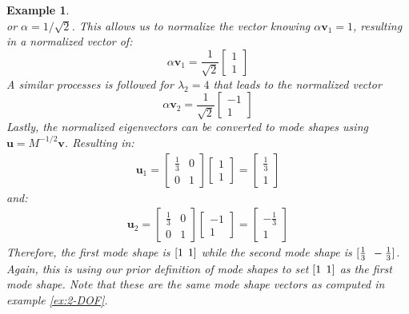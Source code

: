 \documentclass[12pt,letter]{article}
\newtheorem{ex}{Example}
\numberwithin{ex}{section} %
\newenvironment{example}{\begin{mdframed}[middlelinewidth=0.5mm]\begin{ex}\normalfont}{\end{ex}\end{mdframed}}
\numberwithin{re}{section} %
\begin{document}
\begin{example}
\begin{equation}
\end{equation}
or $\alpha = 1/\sqrt{2}$. This allows us to normalize the vector knowing $\alpha \textbf{v}_1=1$, resulting in a normalized vector of:
\begin{equation}
\alpha \textbf{v}_1=  \frac{1}{\sqrt{2}} \begin{bmatrix} 1 \\ 1 \end{bmatrix} 
\end{equation} 
A similar processes is followed for $\lambda_2=4$ that leads to the normalized vector 
\begin{equation}
\alpha \textbf{v}_2=  \frac{1}{\sqrt{2}} \begin{bmatrix} -1 \\ 1 \end{bmatrix} 
\end{equation} 
Lastly, the normalized eigenvectors can be converted to mode shapes using $\textbf{u} = M^{-1/2}\textbf{v}$. Resulting in: 
\begin{eqnarray}
\textbf{u}_1 =  \begin{bmatrix} \frac{1}{3} & 0  \\  0 & 1 \end{bmatrix}   \begin{bmatrix} 1 \\  1 \end{bmatrix} =  \begin{bmatrix} \frac{1}{3} \\  1 \end{bmatrix}
\end{eqnarray}
and:
\begin{eqnarray}
\textbf{u}_2 =  \begin{bmatrix} \frac{1}{3} & 0  \\  0 & 1 \end{bmatrix}   \begin{bmatrix} -1 \\  1 \end{bmatrix} =  \begin{bmatrix} -\frac{1}{3} \\  1 \end{bmatrix}
\end{eqnarray}
Therefore, the first mode shape is $[1 \hspace{1ex} 1]$ while the second mode shape is $[\frac{1}{3} \hspace{1ex} -\frac{1}{3}]$. Again, this is using our prior definition of mode shapes to set $[1 \hspace{1ex} 1]$ as the first mode shape. Note that these are the same mode shape vectors as computed in example \ref{ex:2-DOF}.
\end{example}
\end{document}
